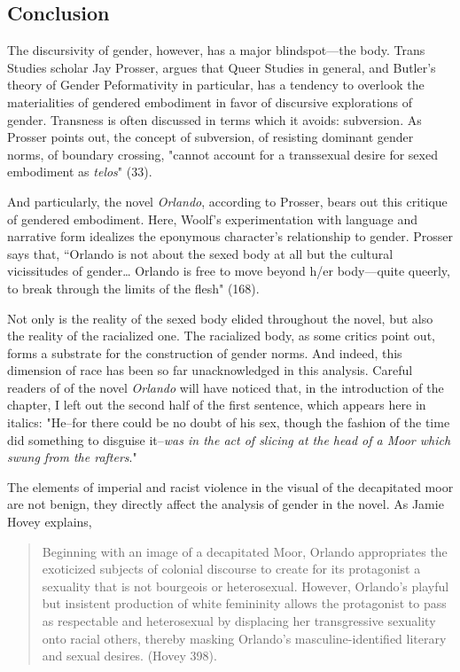 \documentclass[11pt]{article}
\begin{document}
\subsection{Conclusion}
\label{sec:orgf0addbe}

The discursivity of gender, however, has a major blindspot---the body.
Trans Studies scholar Jay Prosser, argues that Queer Studies in
general, and Butler's theory of Gender Peformativity in particular,
has a tendency to overlook the materialities of gendered embodiment in
favor of discursive explorations of gender. Transness is often
discussed in terms which it avoids: subversion. As Prosser points out,
the concept of subversion, of resisting dominant gender norms, of
boundary crossing, "cannot account for a transsexual desire for sexed
embodiment as \emph{telos}" (33).

And particularly, the novel \emph{Orlando}, according to Prosser, bears out
this critique of gendered embodiment. Here, Woolf’s experimentation
with language and narrative form idealizes the eponymous character's
relationship to gender. Prosser says that, “Orlando is not about the
sexed body at all but the cultural vicissitudes of gender\ldots{} Orlando
is free to move beyond h/er body–--quite queerly, to break through the
limits of the flesh" (168).

Not only is the reality of the sexed body elided throughout the novel,
but also the reality of the racialized one. The racialized body, as
some critics point out, forms a substrate for the construction of
gender norms. And indeed, this dimension of race has been so far
unacknowledged in this analysis. Careful readers of of the novel
\emph{Orlando} will have noticed that, in the introduction of the chapter,
I left out the second half of the first sentence, which appears here
in italics: "He--for there could be no doubt of his sex, though the
fashion of the time did something to disguise it--\emph{was in the act of
slicing at the head of a Moor which swung from the rafters}."

The elements of imperial and racist violence in the visual of the
decapitated moor are not benign, they directly affect the analysis of
gender in the novel. As Jamie Hovey explains,

\begin{quote}
Beginning with an image of a decapitated Moor, Orlando appropriates
the exoticized subjects of colonial discourse to create for its
protagonist a sexuality that is not bourgeois or heterosexual.
However, Orlando's playful but insistent production of white
femininity allows the protagonist to pass as respectable and
heterosexual by displacing her transgressive sexuality onto racial
others, thereby masking Orlando's masculine-identified literary and
sexual desires. (Hovey 398).
\end{quote}
\end{document}
